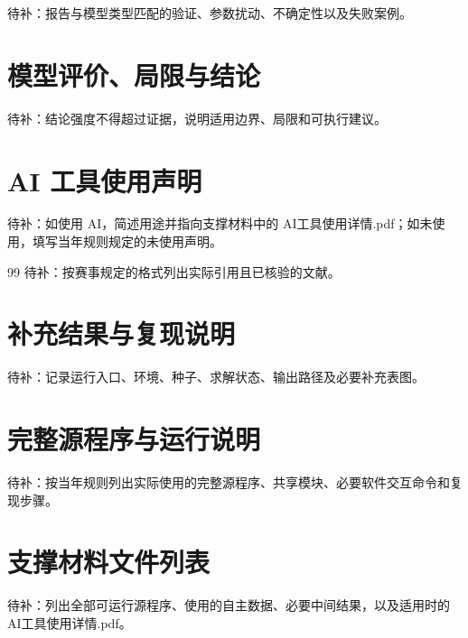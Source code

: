\documentclass[UTF8,zihao=-4]{ctexart}
\begin{document}
待补：报告与模型类型匹配的验证、参数扰动、不确定性以及失败案例。

\section{模型评价、局限与结论}

待补：结论强度不得超过证据，说明适用边界、局限和可执行建议。

\section*{AI 工具使用声明}

待补：如使用 AI，简述用途并指向支撑材料中的 AI工具使用详情.pdf；如未使用，填写当年规则规定的未使用声明。

\begin{thebibliography}{99}
待补：按赛事规定的格式列出实际引用且已核验的文献。
\end{thebibliography}

\appendix
\section{补充结果与复现说明}

待补：记录运行入口、环境、种子、求解状态、输出路径及必要补充表图。

\section{完整源程序与运行说明}

待补：按当年规则列出实际使用的完整源程序、共享模块、必要软件交互命令和复现步骤。

\section{支撑材料文件列表}

待补：列出全部可运行源程序、使用的自主数据、必要中间结果，以及适用时的 AI工具使用详情.pdf。
\end{document}
